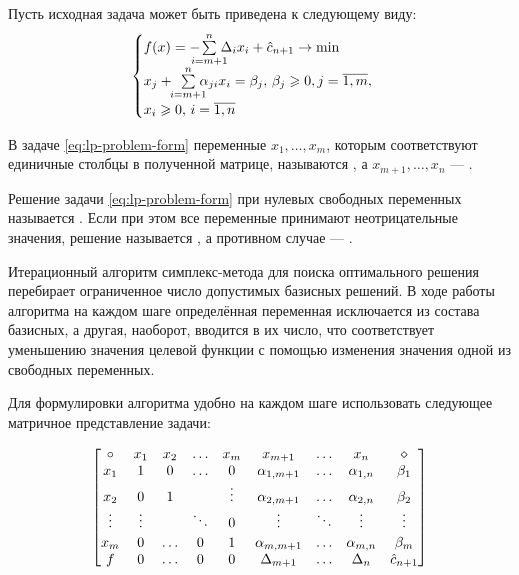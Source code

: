 Пусть исходная задача может быть приведена к следующему виду:
\begin{equation}
  \label{eq:lp-problem-form}
  \begin{cases}
    f(x) = -{\!\!\!\!\suml_{i={m+1}}^n{\!\!\!\!\Delta_{i} x_i}} + \hat{c}_{n+1} \to \min \\
    x_j + \!\! \suml_{i=m+1}^n {\!\!\!\!\alpha_{ji} x_i} = \beta_j,\,
    \beta_j \geq 0, j = \overline{1, m},\\
    x_i \geq 0,\, i = \overline{1, n}
  \end{cases}
\end{equation}

\begin{dfn}
  В задаче \eqref{eq:lp-problem-form} переменные $x_1, \dotsc, x_m$,
  которым соответствуют единичные столбцы в полученной матрице,
  называются , а $x_{m+1}, \dotsc, x_n$ —
  .
\end{dfn}

\begin{dfn}
  Решение задачи \eqref{eq:lp-problem-form} при нулевых свободных
  переменных называется . Если при этом все
  переменные принимают неотрицательные значения, решение называется
  , а противном случае — .
\end{dfn}

Итерационный алгоритм симплекс-метода для поиска оптимального решения
перебирает ограниченное число допустимых базисных решений. В ходе
работы алгоритма на каждом шаге определённая переменная исключается из
состава базисных, а другая, наоборот, вводится в их число, что
соответствует уменьшению значения целевой функции с помощью изменения
значения одной из свободных переменных.

Для формулировки алгоритма удобно на каждом шаге использовать
следующее матричное представление задачи:

\begin{equation}
  \label{eq:lp-matrix}
  \begin{bmatrix}
    \circ  & x_1 & x_2 & \hdots & x_m   & x_{m+1} & \hdots & x_n & \diamond\\
    x_1    & 1   & 0   & \hdots & 0     & \alpha_{1,{m+1}} & \hdots & \alpha_{1,n} & \beta_1 \\
    x_2    & 0   & 1   &        & \vdots & \alpha_{2,{m+1}} & \hdots & \alpha_{2,n} & \beta_2 \\
    \vdots & \vdots &  &\vspace{2pt}\ddots  & 0      & \vdots & \ddots & \vdots & \vdots \\
    x_m   & 0       & \hdots & 0 & 1 & \alpha_{m,{m+1}} & \hdots & \alpha_{m,n} & \beta_m \\
    f & 0 & \hdots & 0 & 0 & \Delta_{m+1} & \hdots & \Delta_n & \hat{c}_{n+1}
  \end{bmatrix}
\end{equation}

